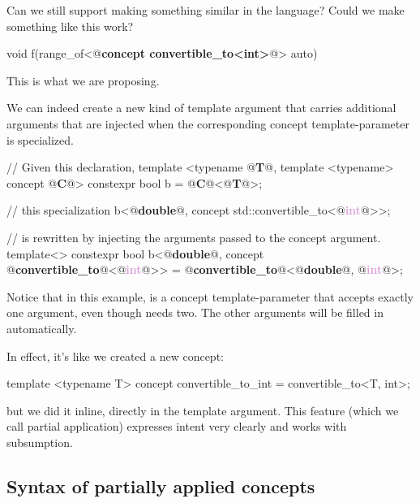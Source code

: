 \documentclass{wg21}
\begin{document}
Can we still support making something similar in the language? Could we make something like this work?

\begin{colorblock}
void f(range_of<@\textbf{concept convertible_to<int>}@> auto)
\end{colorblock}

This is what we are proposing.


We can indeed create a new kind of template argument that carries additional arguments that are injected when the corresponding concept template-parameter is specialized.
\begin{colorblock}
// Given this declaration,
template <typename @\textbf{\textcolor{OliveGreen}{T}}@, template <typename> concept @\textbf{\textcolor{WildStrawberry}{C}}@>
constexpr bool b = @\textbf{\textcolor{WildStrawberry}{C}}@<@\textbf{\textcolor{OliveGreen}{T}}@>;

// this specialization
b<@\textbf{\textcolor{OliveGreen}{double}}@, concept std::convertible_to<@\textbf{\textcolor{Plum}{int}}@>>;

// is rewritten by injecting the arguments passed to the concept argument.
template<>
constexpr bool b<@\textbf{\textcolor{OliveGreen}{double}}@, concept @\textbf{\textcolor{WildStrawberry}{convertible_to}}@<@\textbf{\textcolor{Plum}{int}}@>> = @\textbf{\textcolor{WildStrawberry}{convertible_to}}@<@\textbf{\textcolor{OliveGreen}{double}}@, @\textbf{\textcolor{Plum}{int}}@>;
\end{colorblock}

Notice that in this example,  is a concept template-parameter that accepts exactly one argument,
even though  needs two.
The other arguments will be filled in automatically.

In effect, it's like we created a new concept:

\begin{colorblock}
template <typename T>
concept convertible_to_int = convertible_to<T, int>;
\end{colorblock}

but we did it inline, directly in the template argument.
This feature (which we call partial application) expresses intent very clearly and works with subsumption.

\subsection{Syntax of partially applied concepts}
\end{document}
